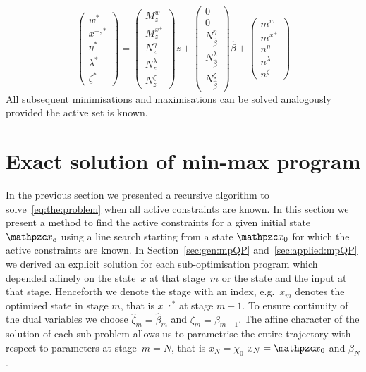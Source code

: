 \documentclass{ifacconf}
\begin{document}
\begin{equation}
	\left(\begin{array}{c}
	w^\ast \\
	x^{+,\ast} \\
	\eta^\ast \\
	\lambda^\ast\\
	\zeta^\ast
	\end{array}\right) = \left(\begin{array}{c}M^w_z\\ M^{x^+}_z \\ N^{\eta}_z \\ N^{\lambda}_z \\ N^{\zeta}_z
	\end{array}\right)z + 
	\left(\begin{array}{c}0\\ 0 \\ N^{\eta}_{\hat\beta} \\ N^{\lambda}_{\hat\beta} \\ N^\zeta_{\hat\beta}
	\end{array}\right)\hat\beta + \left(\begin{array}{c}m^w\\ m^{x^+} \\ n^{\eta} \\ n^{\lambda}\\ n^\zeta
	\end{array}\right)
\end{equation}
All subsequent minimisations and maximisations can be solved analogously provided the active set is
known.


\section{Exact solution of min-max program}\label{sec:line:search}
In the previous section we presented a recursive algorithm to solve~\eqref{eq:the:problem}
when all active constraints are known. In this section we present a method to find the active
constraints for a given initial state $\mathpzc x_e$ using a line search starting from a state $\mathpzc x_0$
for which the active constraints are known. In Section~\ref{sec:gen:mpQP} and~\ref{sec:applied:mpQP}
we derived an explicit solution for each sub-optimisation program which depended affinely on the
state~$x$ at that stage~$m$ or the state and the input at that stage. Henceforth we denote the stage 
with an index, e.g.~$x_m$ denotes the optimised state in stage $m$, that is $x^{+,\ast}$ at stage $m+1$.
To ensure continuity of the dual variables we choose $\hat\zeta_m = \hat\beta_m$ and $\zeta_m=\beta_{m-1}$.
The affine character of the solution of each sub-problem allows us to parametrise the entire trajectory
with respect to parameters at stage~$m=N$, that is $x_N=\chi_0$ $x_N=\mathpzc x_0$ and $\beta_N$.
\end{document}
